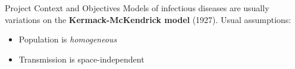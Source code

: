 \begin{slide}{Project Context and Objectives}
	Models of infectious diseases are usually variations on the \textbf{Kermack-McKendrick model} (1927).
	Usual assumptions:
	\begin{itemize}
		\item Population is \emph{homogeneous}
		\item Transmission is space-independent
	\end{itemize}
\end{slide}